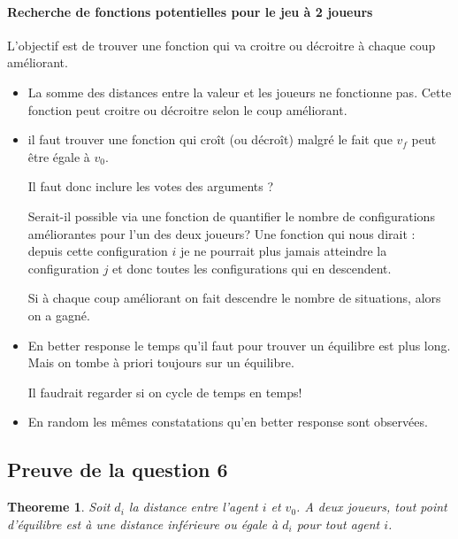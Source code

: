 \documentclass[12pt]{article}
\newtheorem{theoreme}{Theoreme}[section]
\theoremstyle{defi}
\theoremstyle{not}
\theoremstyle{prob}
\begin{document}
      \paragraph{Recherche de fonctions potentielles pour le jeu à 2 joueurs}

        L'objectif est de trouver une fonction qui va croitre ou décroitre à chaque coup améliorant.

        \begin{itemize}
          \item La somme des distances entre la valeur et les joueurs ne fonctionne pas.
            Cette fonction peut croitre ou décroitre selon le coup améliorant.

          \item il faut trouver une fonction qui croît (ou décroît) malgré le fait que $v_f$ peut être égale à $v_0$.

            Il faut donc inclure les votes des arguments ?

            Serait-il possible via une fonction de quantifier le nombre de configurations améliorantes pour l'un des deux joueurs? Une fonction qui nous dirait : depuis cette configuration $i$ je ne pourrait plus jamais atteindre la configuration $j$ et donc toutes les configurations qui en descendent.

            Si à chaque coup améliorant on fait descendre le nombre de situations, alors on a gagné.

          \item En better response le temps qu'il faut pour trouver un équilibre est plus long. Mais on tombe à priori toujours sur un équilibre.

          Il faudrait regarder si on cycle de temps en temps!

          \item En random les mêmes constatations qu'en better response sont observées.
        \end{itemize}
    \subsection{Preuve de la question 6}
    \begin{theoreme}
    \label{thm:question_6}
      Soit $d_i$ la distance entre l'agent $i$ et $v_0$. A deux joueurs, tout point d'équilibre est à une distance inférieure ou égale à $d_i$ pour tout agent $i$.
    \end{theoreme}
\end{document}
